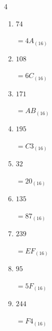 \begin{multicols}{4}
\begin{enumerate}
        $=2B_{(16)}$

  \item $74$

        $=4A_{(16)}$

  \item $108$

        $=6C_{(16)}$

  \item $171$

        $=AB_{(16)}$

  \item $195$

        $=C3_{(16)}$

  \item $32$

        $=20_{(16)}$

  \item $135$

        $=87_{(16)}$

  \item $239$

        $=EF_{(16)}$

  \item $95$

        $=5F_{(16)}$

  \item $244$

        $=F4_{(16)}$

\end{enumerate}
\end{multicols}
